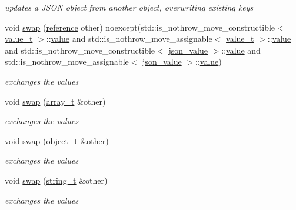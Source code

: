 \begin{DoxyCompactItemize}
\begin{DoxyCompactList}\small\item\em updates a J\+S\+ON object from another object, overwriting existing keys \end{DoxyCompactList}\item 
void \mbox{\hyperlink{classnlohmann_1_1basic__json_a8c9d932353e1ab98a7dc2fc27e002031}{swap}} (\mbox{\hyperlink{classnlohmann_1_1basic__json_ac6a5eddd156c776ac75ff54cfe54a5bc}{reference}} other) noexcept(std\+::is\+\_\+nothrow\+\_\+move\+\_\+constructible$<$ \mbox{\hyperlink{namespacenlohmann_1_1detail_a1ed8fc6239da25abcaf681d30ace4985}{value\+\_\+t}} $>$\+::\mbox{\hyperlink{classnlohmann_1_1basic__json_adcf8ca5079f5db993820bf50036bf45d}{value}} and std\+::is\+\_\+nothrow\+\_\+move\+\_\+assignable$<$ \mbox{\hyperlink{namespacenlohmann_1_1detail_a1ed8fc6239da25abcaf681d30ace4985}{value\+\_\+t}} $>$\+::\mbox{\hyperlink{classnlohmann_1_1basic__json_adcf8ca5079f5db993820bf50036bf45d}{value}} and std\+::is\+\_\+nothrow\+\_\+move\+\_\+constructible$<$ \mbox{\hyperlink{unionnlohmann_1_1basic__json_1_1json__value}{json\+\_\+value}} $>$\+::\mbox{\hyperlink{classnlohmann_1_1basic__json_adcf8ca5079f5db993820bf50036bf45d}{value}} and std\+::is\+\_\+nothrow\+\_\+move\+\_\+assignable$<$ \mbox{\hyperlink{unionnlohmann_1_1basic__json_1_1json__value}{json\+\_\+value}} $>$\+::\mbox{\hyperlink{classnlohmann_1_1basic__json_adcf8ca5079f5db993820bf50036bf45d}{value}})
\begin{DoxyCompactList}\small\item\em exchanges the values \end{DoxyCompactList}\item 
void \mbox{\hyperlink{classnlohmann_1_1basic__json_a65b0a24e1361a030ad0a661de22f6c8e}{swap}} (\mbox{\hyperlink{classnlohmann_1_1basic__json_ae095578e03df97c5b3991787f1056374}{array\+\_\+t}} \&other)
\begin{DoxyCompactList}\small\item\em exchanges the values \end{DoxyCompactList}\item 
void \mbox{\hyperlink{classnlohmann_1_1basic__json_ac31f12587d2f1a3be5ffc394aa9d72a4}{swap}} (\mbox{\hyperlink{classnlohmann_1_1basic__json_a5e48a7893520e1314bf0c9723e26ea2a}{object\+\_\+t}} \&other)
\begin{DoxyCompactList}\small\item\em exchanges the values \end{DoxyCompactList}\item 
void \mbox{\hyperlink{classnlohmann_1_1basic__json_adaa1ed0a889d86c8e0216a3d66980f76}{swap}} (\mbox{\hyperlink{classnlohmann_1_1basic__json_a61f8566a1a85a424c7266fb531dca005}{string\+\_\+t}} \&other)
\begin{DoxyCompactList}\small\item\em exchanges the values \end{DoxyCompactList}\end{DoxyCompactItemize}
